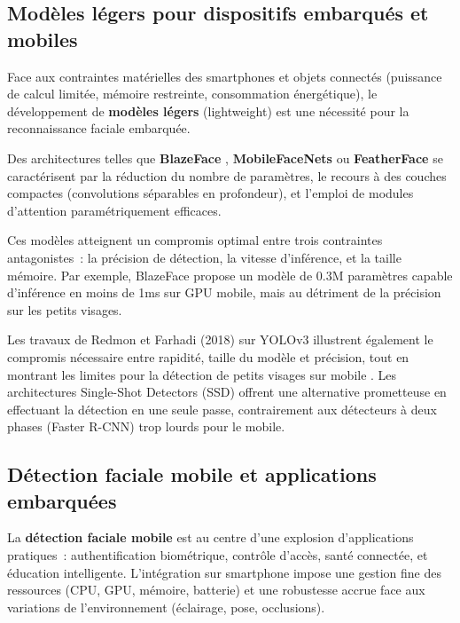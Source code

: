 \begin{onehalfspace}
\subsection{Modèles légers pour dispositifs embarqués et mobiles}

\hspace{0.65 cm}Face aux contraintes matérielles des smartphones et objets connectés (puissance de calcul limitée, mémoire restreinte, consommation énergétique), le développement de \textbf{modèles légers} (lightweight) est une nécessité pour la reconnaissance faciale embarquée.

\hspace{0.65 cm}Des architectures telles que \textbf{BlazeFace} \cite{Zhang2019BlazeFace}, \textbf{MobileFaceNets} \cite{Chen2018MobileFaceNets} ou \textbf{FeatherFace} \cite{Kim2025FeatherFace} se caractérisent par la réduction du nombre de paramètres, le recours à des couches compactes (convolutions séparables en profondeur), et l'emploi de modules d'attention paramétriquement efficaces.

\hspace{0.65 cm}Ces modèles atteignent un compromis optimal entre trois contraintes antagonistes~: la précision de détection, la vitesse d'inférence, et la taille mémoire. Par exemple, BlazeFace propose un modèle de 0.3M paramètres capable d'inférence en moins de 1ms sur GPU mobile, mais au détriment de la précision sur les petits visages.

\hspace{0.65 cm}Les travaux de Redmon et Farhadi (2018) sur YOLOv3 illustrent également le compromis nécessaire entre rapidité, taille du modèle et précision, tout en montrant les limites pour la détection de petits visages sur mobile \cite{Redmon2018YOLOv3}. Les architectures Single-Shot Detectors (SSD) \cite{Liu2016SSD} offrent une alternative prometteuse en effectuant la détection en une seule passe, contrairement aux détecteurs à deux phases (Faster R-CNN) trop lourds pour le mobile.

\subsection{Détection faciale mobile et applications embarquées}

\hspace{0.65 cm}La \textbf{détection faciale mobile} est au centre d'une explosion d'applications pratiques~: authentification biométrique, contrôle d'accès, santé connectée, et éducation intelligente. L'intégration sur smartphone impose une gestion fine des ressources (CPU, GPU, mémoire, batterie) et une robustesse accrue face aux variations de l'environnement (éclairage, pose, occlusions).


\end{onehalfspace}
